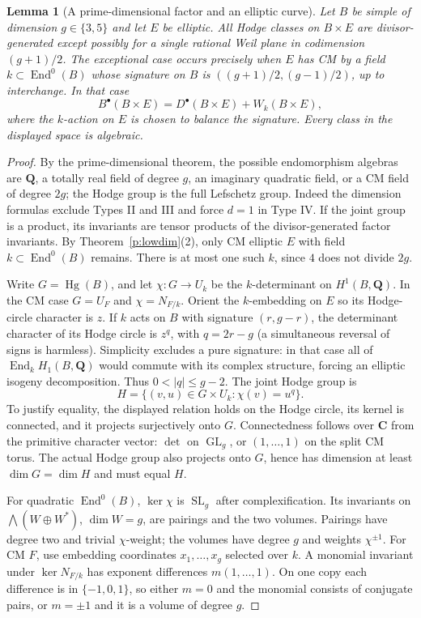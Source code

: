 \documentclass[11pt,reqno]{article}
\theoremstyle{emphasizedplain}
\theoremstyle{emphasizeddefinition}
\theoremstyle{emphasizeddefinition}
\newtheorem{prelemma}{Lemma}
\DeclareMathOperator{\End}{End}
\DeclareMathOperator{\Hg}{Hg}
\DeclareMathOperator{\GL}{GL}
\DeclareMathOperator{\SL}{SL}
\newcommand{\Q}{\mathbf Q}
\newcommand{\C}{\mathbf C}
\begin{document}
\begin{prelemma}[A prime-dimensional factor and an elliptic curve]
\label{p:prime-ell}
Let $B$ be simple of dimension $g\in\{3,5\}$ and let $E$ be elliptic.
All Hodge classes on $B\times E$ are divisor-generated except possibly
for a single rational Weil plane in codimension $(g+1)/2$.
The exceptional case occurs precisely when $E$ has CM by a field
$k\subset\End^0(B)$ whose signature on $B$ is
$((g+1)/2,(g-1)/2)$, up to interchange. In that case
\[
 B^\bullet(B\times E)=D^\bullet(B\times E)+W_k(B\times E),
\]
where the $k$-action on $E$ is chosen to balance the signature.
Every class in the displayed space is algebraic.
\end{prelemma}
\begin{proof}
By the prime-dimensional theorem, the possible endomorphism algebras are
$\Q$, a totally real field of degree $g$, an imaginary quadratic field,
or a CM field of degree $2g$; the Hodge group is the full Lefschetz group.
Indeed the dimension formulas exclude Types II and III and force $d=1$
in Type IV. If the joint group is a product, its invariants are tensor
products of the divisor-generated factor invariants.
By Theorem~\ref{p:lowdim}(2), only CM elliptic $E$ with field
$k\subset\End^0(B)$ remains. There is at most one such $k$, since
$4$ does not divide $2g$.

Write $G=\Hg(B)$, and let $\chi:G\to U_k$ be the $k$-determinant on
$H^1(B,\Q)$. In the CM case $G=U_F$ and $\chi=N_{F/k}$.
Orient the $k$-embedding on $E$ so its Hodge-circle character is $z$.
If $k$ acts on $B$ with signature $(r,g-r)$, the determinant character
of its Hodge circle is $z^q$, with $q=2r-g$ (a simultaneous reversal of
signs is harmless). Simplicity excludes a pure signature: in that case
all of $\End_k H_1(B,\Q)$ would commute with its complex structure,
forcing an elliptic isogeny decomposition. Thus $0<|q|\leq g-2$.
The joint Hodge group is
\[
 H=\{(v,u)\in G\times U_k:\chi(v)=u^q\}.
\]
To justify equality, the displayed relation holds on the Hodge circle,
its kernel is connected, and it projects surjectively onto $G$.
Connectedness follows over $\C$ from the primitive character vector:
$\det$ on $\GL_g$, or $(1,\ldots,1)$ on the split CM torus.
The actual Hodge group also projects onto $G$, hence has dimension at
least $\dim G=\dim H$ and must equal $H$.

For quadratic $\End^0(B)$, $\ker\chi$ is $\SL_g$ after complexification.
Its invariants on $\bigwedge(W\oplus W^*)$, $\dim W=g$, are pairings
and the two volumes. Pairings have degree two and trivial $\chi$-weight;
the volumes have degree $g$ and weights $\chi^{\pm1}$.
For CM $F$, use embedding coordinates $x_1,\ldots,x_g$ selected over
$k$. A monomial invariant under $\ker N_{F/k}$ has exponent differences
$m(1,\ldots,1)$. On one copy each difference is in $\{-1,0,1\}$,
so either $m=0$ and the monomial consists of conjugate pairs, or $m=\pm1$
and it is a volume of degree $g$.


\end{proof}
\end{document}
